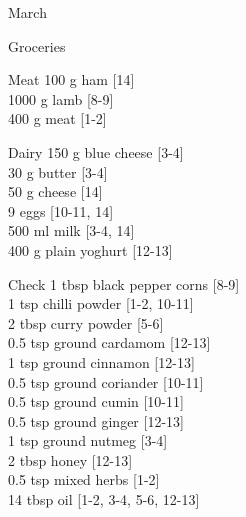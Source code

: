 \begin{menu}{March}
\begin{shoppinglist}{Groceries}
      \end{shoppinglist}%
      \par\vfil %
      \begin{shoppinglist}{Meat}
      100 g ham 
        {\scriptsize[14]}\\
      1000 g lamb 
        {\scriptsize[8-9]}\\
      400 g meat 
        {\scriptsize[1-2]}\\
      \end{shoppinglist}%
      \begin{shoppinglist}{Dairy}
      150 g blue cheese 
        {\scriptsize[3-4]}\\
      30 g butter 
        {\scriptsize[3-4]}\\
      50 g cheese 
        {\scriptsize[14]}\\
      9  eggs 
        {\scriptsize[10-11, 14]}\\
      500 ml milk 
        {\scriptsize[3-4, 14]}\\
      400 g plain yoghurt 
        {\scriptsize[12-13]}\\
      \end{shoppinglist}%
      \par\vfil %
      \vfil\clearpage %
      \begin{shoppinglist}{Check}
      1 tbsp black pepper corns 
        {\scriptsize[8-9]}\\
      1 tsp chilli powder 
        {\scriptsize[1-2, 10-11]}\\
      2 tbsp curry powder 
        {\scriptsize[5-6]}\\
      0.5 tsp ground cardamom 
        {\scriptsize[12-13]}\\
      1 tsp ground cinnamon 
        {\scriptsize[12-13]}\\
      0.5 tsp ground coriander 
        {\scriptsize[10-11]}\\
      0.5 tsp ground cumin 
        {\scriptsize[10-11]}\\
      0.5 tsp ground ginger 
        {\scriptsize[12-13]}\\
      1 tsp ground nutmeg 
        {\scriptsize[3-4]}\\
      2 tbsp honey 
        {\scriptsize[12-13]}\\
      0.5 tsp mixed herbs 
        {\scriptsize[1-2]}\\
      14 tbsp oil 
        {\scriptsize[1-2, 3-4, 5-6, 12-13]}\\

\end{shoppinglist}
\end{menu}
